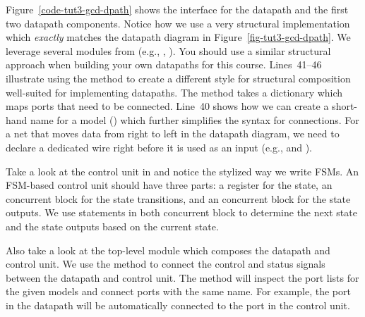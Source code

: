 \documentclass{cbxdoc}
\begin{document}
Figure~\ref{code-tut3-gcd-dpath} shows the interface for the datapath and
the first two datapath components. Notice how we use a very structural
implementation which \emph{exactly} matches the datapath diagram in
Figure~\ref{fig-tut3-gcd-dpath}. We leverage several modules from
 (e.g., , ). You should use a similar
structural approach when building your own datapaths for this course.
Lines~41--46 illustrate using the  method to create a
different style for structural composition well-suited for implementing
datapaths. The  method takes a dictionary which maps
ports that need to be connected. Line~40 shows how we can create a
short-hand name for a model () which further simplifies the syntax
for connections. For a net that moves data from right to left in the
datapath diagram, we need to declare a dedicated wire right before it is
used as an input (e.g.,  and ).

\begin{figure}[b]
\begin{minipage}[b]{0.57\tw}
  
\end{minipage}%
\hfill%
\begin{minipage}[b]{0.4\tw}
  
\end{minipage}%
\end{figure}

Take a look at the control unit in  and notice the
stylized way we write FSMs. An FSM-based control unit should have three
parts: a register for the state, an  concurrent block
for the state transitions, and an  concurrent block
for the state outputs. We use  statements in both concurrent block
to determine the next state and the state outputs based on the current
state.


\afterpage{\clearpage}

Also take a look at the top-level module which composes the datapath and
control unit. We use the  method to connect the
control and status signals between the datapath and control unit. The
 method will inspect the port lists for the given
models and connect ports with the same name. For example, the
 port in the datapath will be automatically connected to
the  port in the control unit.

% 
\end{document}
